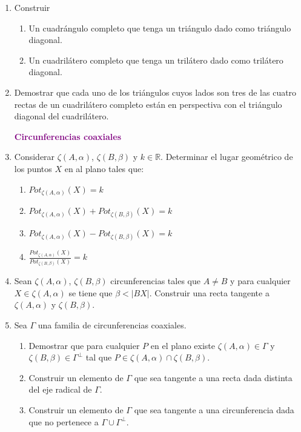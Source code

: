 \documentclass[12pt]{report}
\numberwithin{section}{chapter}
\newcommand{\R}{\mathbb R}
\begin{document}
\begin{enumerate}
\item Construir
\begin{enumerate}
\item Un cuadrángulo completo que tenga un triángulo dado como triángulo diagonal.
\item Un cuadrilátero completo que tenga un trilátero dado como trilátero diagonal.
\end{enumerate}
                                                           
\item Demostrar que cada uno de los triángulos cuyos lados son tres de las cuatro rectas de un cuadrilátero completo están en perspectiva con el triángulo diagonal del cuadrilátero.

\begin{center}
\textcolor{purple}{\textbf{\large Circunferencias coaxiales}}
\end{center}

\item Considerar $\zeta(A, \alpha)$, $\zeta(B,\beta)$ y $k \in \R$. Determinar el lugar geométrico de los puntos $X$ en al plano tales que:
\begin{enumerate}
\item $Pot_{\zeta(A,\alpha)} (X)=k$
\item $Pot_{\zeta(A,\alpha)} (X) + Pot_{\zeta(B,\beta)} (X)=k$
\item $Pot_{\zeta(A,\alpha)} (X) - Pot_{\zeta(B,\beta)} (X)=k$
\item $\frac{Pot_{\zeta(A,\alpha)} (X)}{Pot_{\zeta(B,\beta)} (X)}=k$
\end{enumerate}

\item Sean $\zeta(A, \alpha)$, $\zeta(B, \beta)$ circunferencias tales que $A \neq B$ y para cualquier $X \in \zeta(A, \alpha)$ se tiene que $\beta < |BX|$. Construir una recta tangente a $\zeta(A, \alpha)$ y $\zeta(B, \beta)$.

\item Sea $\Gamma$ una familia de circunferencias coaxiales.
\begin{enumerate}
\item Demostrar que para cualquier $P$ en el plano existe $\zeta(A, \alpha) \in \Gamma$ y $\zeta(B,\beta) \in \Gamma^\bot$ tal que \break $P \in \zeta(A, \alpha) \cap \zeta(B,\beta)$.
\item Construir un elemento de $\Gamma$ que sea tangente a una recta dada distinta del eje radical de $\Gamma$.
\item Construir un elemento de $\Gamma$ que sea tangente a una circunferencia dada que no pertenece a $\Gamma \cup \Gamma^\bot$.
\end{enumerate}


\end{enumerate}
\end{document}
